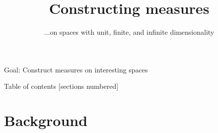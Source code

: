 \documentclass[10pt]{beamer}
\title{Constructing measures}
\subtitle{...on spaces with unit, finite, and infinite dimensionality}
\begin{document}
\maketitle


\begin{frame}[standout]
Goal: Construct \alert{measures} on interesting spaces
\end{frame}

\begin{frame}{Table of contents}
  [sections numbered]
  \tableofcontents[hideallsubsections]
\end{frame}

\section{Background}
\end{document}
